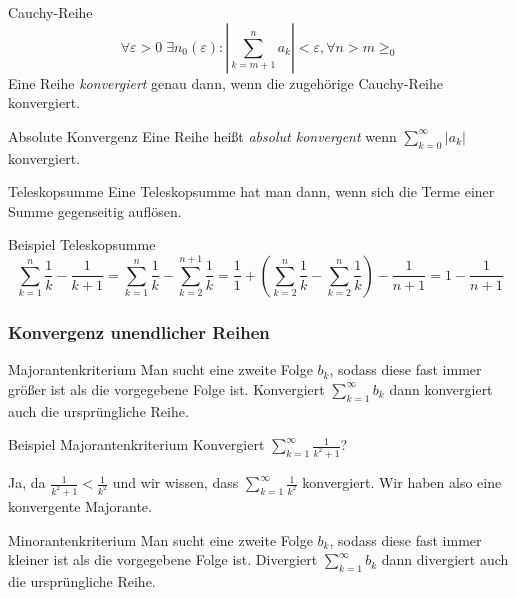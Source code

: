 \documentclass[german]{spicker}
\begin{document}
\begin{defi}{Cauchy-Reihe}
    \[
        \forall\varepsilon>0 \;\exists n_0(\varepsilon) : \left| \sum_{k=m+1}^n a_k \right| < \varepsilon , \forall n>m\geq _0
    \]
    Eine Reihe \emph{konvergiert} genau dann, wenn die zugehörige Cauchy-Reihe konvergiert.
\end{defi}

\begin{defi}{Absolute Konvergenz}
    Eine Reihe heißt \emph{absolut konvergent} wenn $\sum_{k=0}^{\infty} |a_k|$ konvergiert.
\end{defi}

\begin{algo}{Teleskopsumme}
    Eine Teleskopsumme hat man dann, wenn sich die Terme einer Summe gegenseitig auflösen.
\end{algo}

\begin{bonus}{Beispiel Teleskopsumme}
    \[
        \sum_{k=1}^n \frac{1}{k} - \frac{1}{k+1} = \sum_{k=1}^n \frac{1}{k} - \sum_{k=2}^{n+1} \frac{1}{k} = \frac{1}{1} +\left( \sum_{k=2}^n \frac{1}{k} - \sum_{k=2}^n \frac{1}{k} \right) - \frac{1}{n+1} = 1-\frac{1}{n+1}
    \]
\end{bonus}
\subsubsection{Konvergenz unendlicher Reihen}

\begin{algo}{Majorantenkriterium}
    Man sucht eine zweite Folge $b_k$, sodass diese fast immer größer ist als die vorgegebene Folge ist.
    Konvergiert $\sum_{k=1}^{\infty} b_k$ dann konvergiert auch die ursprüngliche Reihe.
\end{algo}

\begin{bonus}{Beispiel Majorantenkriterium}
    Konvergiert $\sum_{k=1}^{\infty} \frac{1}{k^2+1}$?

    Ja, da $\frac{1}{k^2+1} < \frac{1}{k^2}$ und wir wissen, dass $\sum_{k=1}^{\infty} \frac{1}{k^2}$ konvergiert.
    Wir haben also eine konvergente Majorante.
\end{bonus}

\begin{algo}{Minorantenkriterium}
    Man sucht eine zweite Folge $b_k$, sodass diese fast immer kleiner ist als die vorgegebene Folge ist.
    Divergiert $\sum_{k=1}^{\infty} b_k$ dann divergiert auch die ursprüngliche Reihe.
\end{algo}
\end{document}
